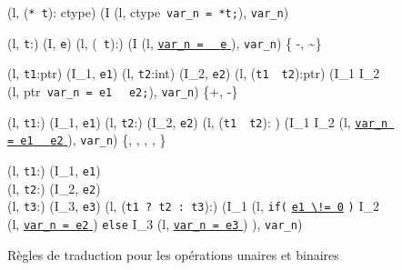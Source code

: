 \begin{figure*}[h!]
  \scriptsize{
    {
      {}
      {(l, (\mbox{\lstinline'* t'}): ctype) 
        (I \concat (l, ctype~\mbox{\lstinline'var_n = *t;'}),
        \mbox{\lstinline'var_n'})}{}
    }

    {
      {(l, \mbox{\lstinline't'}:)  (I, \mbox{\lstinline'e'})
      } {(l, (~\mbox{\lstinline't'}):) 
        (I
        \concat (l, \underline{\Zinit \mbox{\lstinline'var_n ='}
          ~~\mbox{\lstinline'e'} \Zclear}
        \semicolon),
        \mbox{\lstinline'var_n'})
      }{ \in \{ -, \sim\}}
    }

    {
      {(l, \mbox{\lstinline't1'}:ptr)  (I_1, \mbox{\lstinline'e1'})
        \quad
        (l, \mbox{\lstinline't2'}:int)  (I_2, \mbox{\lstinline'e2'})}
      {(l, (\mbox{\lstinline't1'}~~\mbox{\lstinline't2'}):ptr)
        (I_1 \concat I_2
        \concat (l, ptr~\mbox{\lstinline'var_n = e1'}~
        ~\mbox{\lstinline'e2;'}),
        \mbox{\lstinline'var_n'})
      }{ \in \{+, -\}}
    }

    {
      {(l, \mbox{\lstinline't1'}:) 
        (I_1, \mbox{\lstinline'e1'}) \quad
        (l, \mbox{\lstinline't2'}:)
         (I_2, \mbox{\lstinline'e2'})}
      {(l, (\mbox{\lstinline't1'}~~\mbox{\lstinline't2'}):
        ) 
        (I_1 \concat I_2 \concat (l,
        \underline{\Zinit \mbox{\lstinline'var_n = e1'} \Zclear
          ~~\mbox{\lstinline'e2'} \Zclear}
        \semicolon
        ), \mbox{\lstinline'var_n'})
      }{
         \in \{\mathtt{+}, \mathtt{-}, \mathtt{/}, \mathtt{\%},
        \mathtt{*} \}
      }
    }

    {
      {(l, \mbox{\lstinline't1'}:) 
        (I_1, \mbox{\lstinline'e1'}) \\
        (l, \mbox{\lstinline't2'}:) 
        (I_2, \mbox{\lstinline'e2'}) \\
        (l, \mbox{\lstinline't3'}:) 
        (I_3, \mbox{\lstinline'e3'})}
      {
        (l, (\mbox{\lstinline't1 ? t2 : t3'}):)
        (I_1
        \concat (l,
        \mbox{\lstinline'if('}
        \underline{\mbox{\lstinline'e1'}\Zclear \mbox{\lstinline' \!= 0'}}
        \mbox{\lstinline')'} \bopen
        I_2
        \concat
        (l, \underline{\Zinit \mbox{\lstinline'var_n = e2'} \Zclear}
        \semicolon )
        \bclose
        \mbox{\lstinline'else'} \bopen
        I_3
        \concat
        (l, \underline{\Zinit \mbox{\lstinline'var_n = e3'} \Zclear}
        \semicolon )
        \bclose ),
        \mbox{\lstinline'var_n'})
      }{}
    }
  }
  \caption{Règles de traduction pour les opérations unaires et binaires}
  \label{fig:op}
\end{figure*}

